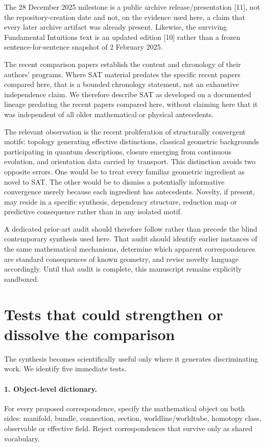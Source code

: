 \documentclass[11pt]{article}
\begin{document}
The 28 December 2025 milestone is a public archive release/presentation [11], not the repository-creation date and not, on the evidence used here, a claim that every later archive artifact was already present. Likewise, the surviving Fundamental Intuitions text is an updated edition [10] rather than a frozen sentence-for-sentence snapshot of 2 February 2025.

The recent comparison papers establish the content and chronology of their authors' programs. Where SAT material predates the specific recent papers compared here, that is a bounded chronology statement, not an exhaustive independence claim. We therefore describe SAT as developed on a documented lineage predating the recent papers compared here, without claiming here that it was independent of all older mathematical or physical antecedents.

The relevant observation is the recent proliferation of structurally convergent motifs: topology generating effective distinctions, classical geometric backgrounds participating in quantum descriptions, closure emerging from continuous evolution, and orientation data carried by transport. This distinction avoids two opposite errors. One would be to treat every familiar geometric ingredient as novel to SAT. The other would be to dismiss a potentially informative convergence merely because each ingredient has antecedents. Novelty, if present, may reside in a specific synthesis, dependency structure, reduction map or predictive consequence rather than in any isolated motif.

A dedicated prior-art audit should therefore follow rather than precede the blind contemporary synthesis used here. That audit should identify earlier instances of the same mathematical mechanisms, determine which apparent correspondences are standard consequences of known geometry, and revise novelty language accordingly. Until that audit is complete, this manuscript remains explicitly sandboxed.

\section{Tests that could strengthen or dissolve the comparison}
The synthesis becomes scientifically useful only where it generates discriminating work. We identify five immediate tests.

\paragraph{1. Object-level dictionary.} For every proposed correspondence, specify the mathematical object on both sides: manifold, bundle, connection, section, worldline/worldtube, homotopy class, observable or effective field. Reject correspondences that survive only as shared vocabulary.
\end{document}
